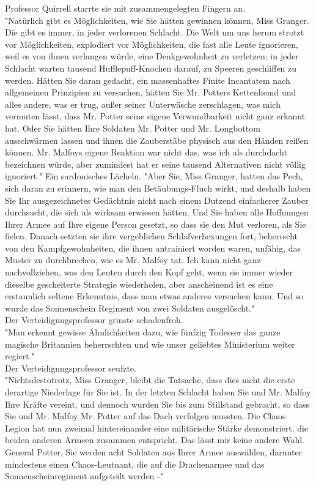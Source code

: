 {Professor Quirrell starrte sie mit zusammengelegten Fingern an.\\ "Natürlich gibt es Möglichkeiten, wie Sie hätten gewinnen können, Miss Granger. Die gibt es immer, in jeder verlorenen Schlacht. Die Welt um uns herum strotzt vor Möglichkeiten, explodiert vor Möglichkeiten, die fast alle Leute ignorieren, weil es von ihnen verlangen würde, eine Denkgewohnheit zu verletzen; in jeder Schlacht warten tausend Hufflepuff-Knochen darauf, zu Speeren geschliffen zu werden. Hätten Sie daran gedacht, ein massenhaftes Finite Incantatem nach allgemeinen Prinzipien zu versuchen, hätten Sie Mr. Potters Kettenhemd und alles andere, was er trug, außer seiner Unterwäsche zerschlagen, was mich vermuten lässt, dass Mr. Potter seine eigene Verwundbarkeit nicht ganz erkannt hat. Oder Sie hätten Ihre Soldaten Mr. Potter und Mr. Longbottom ausschwärmen lassen und ihnen die Zauberstäbe physisch aus den Händen reißen können. Mr. Malfoys eigene Reaktion war nicht das, was ich als durchdacht bezeichnen würde, aber zumindest hat er seine tausend Alternativen nicht völlig ignoriert." Ein sardonisches Lächeln. "Aber Sie, Miss Granger, hatten das Pech, sich daran zu erinnern, wie man den Betäubungs-Fluch wirkt, und deshalb haben Sie Ihr ausgezeichnetes Gedächtnis nicht nach einem Dutzend einfacherer Zauber durchsucht, die sich als wirksam erwiesen hätten. Und Sie haben alle Hoffnungen Ihrer Armee auf Ihre eigene Person gesetzt, so dass sie den Mut verloren, als Sie fielen. Danach setzten sie ihre vergeblichen Schlafverhexungen fort, beherrscht von den Kampfgewohnheiten, die ihnen antrainiert worden waren, unfähig, das Muster zu durchbrechen, wie es Mr. Malfoy tat. Ich kann nicht ganz nachvollziehen, was den Leuten durch den Kopf geht, wenn sie immer wieder dieselbe gescheiterte Strategie wiederholen, aber anscheinend ist es eine erstaunlich seltene Erkenntnis, dass man etwas anderes versuchen kann. Und so wurde das Sonnenschein Regiment von zwei Soldaten ausgelöscht."\\ Der Verteidigungsprofessor grinste schadenfroh.\\ "Man erkennt gewisse Ähnlichkeiten dazu, wie fünfzig Todesser das ganze magische Britannien beherrschten und wie unser geliebtes Ministerium weiter regiert."\\ Der Verteidigungsprofessor seufzte.\\ "Nichtsdestotrotz, Miss Granger, bleibt die Tatsache, dass dies nicht die erste derartige Niederlage für Sie ist. In der letzten Schlacht haben Sie und Mr. Malfoy Ihre Kräfte vereint, und dennoch wurden Sie bis zum Stillstand gebracht, so dass Sie und Mr. Malfoy Mr. Potter auf das Dach verfolgen mussten. Die Chaos Legion hat nun zweimal hintereinander eine militärische Stärke demonstriert, die beiden anderen Armeen zusammen entspricht. Das lässt mir keine andere Wahl. General Potter, Sie werden acht Soldaten aus Ihrer Armee auswählen, darunter mindestens einen Chaos-Leutnant, die auf die Drachenarmee und das Sonnenscheinregiment aufgeteilt werden -"

}
